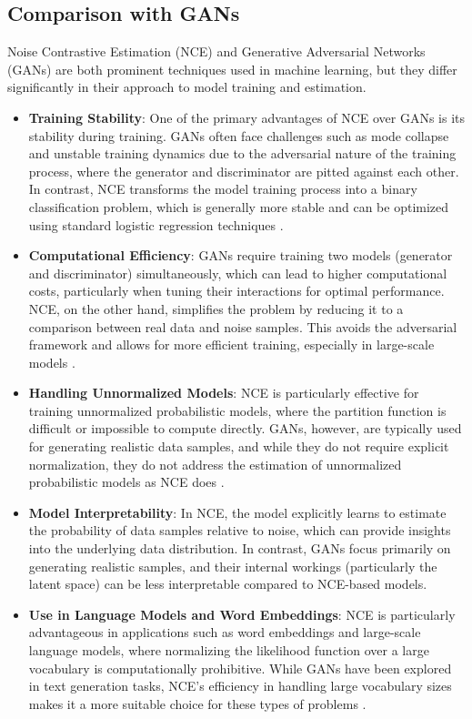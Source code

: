 \subsection{Comparison with GANs}

Noise Contrastive Estimation (NCE) and Generative Adversarial Networks (GANs) are both prominent techniques used in machine learning, but they differ significantly in their approach to model training and estimation.

\begin{itemize}
    \item \textbf{Training Stability}: One of the primary advantages of NCE over GANs is its stability during training. GANs often face challenges such as mode collapse and unstable training dynamics due to the adversarial nature of the training process, where the generator and discriminator are pitted against each other. In contrast, NCE transforms the model training process into a binary classification problem, which is generally more stable and can be optimized using standard logistic regression techniques \citep{10.18653/v1/e17-2003}.
    
    \item \textbf{Computational Efficiency}: GANs require training two models (generator and discriminator) simultaneously, which can lead to higher computational costs, particularly when tuning their interactions for optimal performance. NCE, on the other hand, simplifies the problem by reducing it to a comparison between real data and noise samples. This avoids the adversarial framework and allows for more efficient training, especially in large-scale models \citep{10.21437/interspeech.2016-1295}.
    
    \item \textbf{Handling Unnormalized Models}: NCE is particularly effective for training unnormalized probabilistic models, where the partition function is difficult or impossible to compute directly. GANs, however, are typically used for generating realistic data samples, and while they do not require explicit normalization, they do not address the estimation of unnormalized probabilistic models as NCE does \citep{10.48550/arxiv.2101.03288}.
    
    \item \textbf{Model Interpretability}: In NCE, the model explicitly learns to estimate the probability of data samples relative to noise, which can provide insights into the underlying data distribution. In contrast, GANs focus primarily on generating realistic samples, and their internal workings (particularly the latent space) can be less interpretable compared to NCE-based models.
    
    \item \textbf{Use in Language Models and Word Embeddings}: NCE is particularly advantageous in applications such as word embeddings and large-scale language models, where normalizing the likelihood function over a large vocabulary is computationally prohibitive. While GANs have been explored in text generation tasks, NCE's efficiency in handling large vocabulary sizes makes it a more suitable choice for these types of problems \citep{10.48550/arxiv.2101.03288}.
\end{itemize}

